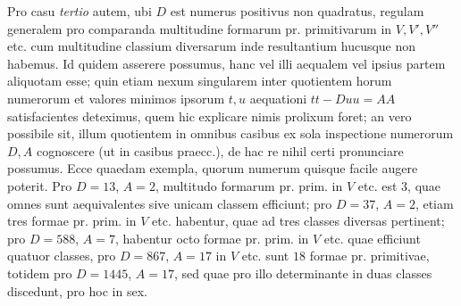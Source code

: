 Pro casu \textit{tertio} autem, ubi \(D\) est numerus positivus non quadratus, regulam generalem pro comparanda multitudine formarum pr. primitivarum in \(V,V',V''\) etc. cum multitudine classium diversarum inde resultantium hucusque non habemus. Id quidem asserere possumus, hanc vel illi aequalem vel ipsius partem aliquotam esse; quin etiam nexum singularem inter quotientem horum numerorum et valores minimos ipsorum \(t,u\) aequationi \(tt-Duu=AA\) satisfacientes deteximus, quem hic explicare nimis prolixum foret; an vero possibile sit, illum quotientem in omnibus casibus ex sola inspectione numerorum \(D,A\) cognoscere (ut in casibus praecc.), de hac re nihil certi pronunciare possumus. Ecce quaedam exempla, quorum numerum quisque facile augere poterit. Pro \(D=13\), \(A=2\), multitudo formarum pr. prim. in \(V\) etc. est \(3\), quae omnes sunt aequivalentes sive unicam classem efficiunt; pro \(D=37\), \(A=2\), etiam tres formae pr. prim. in \(V\) etc. habentur, quae ad tres classes diversas pertinent; pro \(D=588\), \(A=7\), habentur octo formae pr. prim. in \(V\) etc. quae efficiunt quatuor classes, pro \(D=867\), \(A=17\) in \(V\) etc. sunt \(18\) formae pr. primitivae, totidem pro \(D=1445\), \(A=17\), sed quae pro illo determinante in duas classes discedunt, pro hoc in sex.

